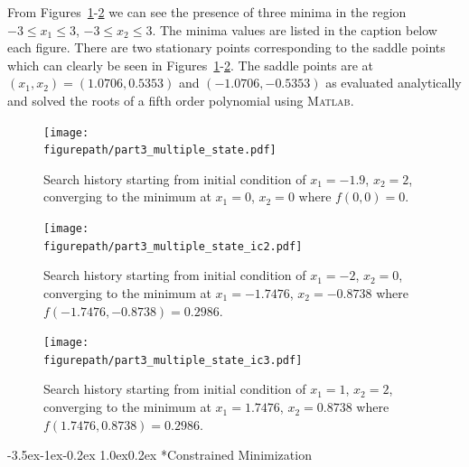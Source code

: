 \documentclass[11pt,letterpaper,onecolumn,notitlepage]{article}
\makeatletter
\newcommand{\figurepath}{../fig/hw1}
\renewcommand\section{\@startsection{section}{1}{\z@}%
{-3.5ex\@plus-1ex\@minus-0.2ex}%
{1.0ex\@plus0.2ex}%
{\fontsize{12pt}{12pt}\selectfont\bfseries\sffamily}}
\makeatother
\begin{document}
From Figures~\ref{fig:part3_multiple_state}-\ref{fig:part3_multiple_state_ic3} we can see the presence of three minima in the region $-3\leq x_{1}\leq3$, $-3\leq x_{2}\leq3$.
The minima values are listed in the caption below each figure.
There are two stationary points corresponding to the saddle points which can clearly be seen in Figures~\ref{fig:part3_multiple_state}-\ref{fig:part3_multiple_state_ic3}.
The saddle points are at $(x_{1},x_{2})=(1.0706,0.5353)$ and $(-1.0706,-0.5353)$ as evaluated analytically and solved the roots of a fifth order polynomial using \textsc{Matlab}.

\begin{figure}[H]
  \begin{center}
    \texttt{[image: \\figurepath/part3\_multiple\_state.pdf]}
    \caption{Search history starting from initial condition of $x_{1}=-1.9$, $x_{2}=2$, converging to the minimum at $x_{1}=0$, $x_{2}=0$ where $f(0,0)=0$.\label{fig:part3_multiple_state}}
  \end{center}
\end{figure}

\vspace{-0.5in}

\begin{figure}[H]
  \centering
  \begin{minipage}{.48\textwidth}
    \centering
    \texttt{[image: \\figurepath/part3\_multiple\_state\_ic2.pdf]}
    \caption{Search history starting from initial condition of $x_{1}=-2$, $x_{2}=0$, converging to the minimum at $x_{1}=-1.7476$, $x_{2}=-0.8738$ where $f(-1.7476,-0.8738)=0.2986$.\label{fig:part3_multiple_state_ic2}}
  \end{minipage}
  \hfill
  \begin{minipage}{.48\textwidth}
    \centering
    \texttt{[image: \\figurepath/part3\_multiple\_state\_ic3.pdf]}
    \caption{Search history starting from initial condition of $x_{1}=1$, $x_{2}=2$, converging to the minimum at $x_{1}=1.7476$, $x_{2}=0.8738$ where $f(1.7476,0.8738)=0.2986$.\label{fig:part3_multiple_state_ic3}}
  \end{minipage}
\end{figure}

\clearpage
\section*{Constrained Minimization}
\end{document}
